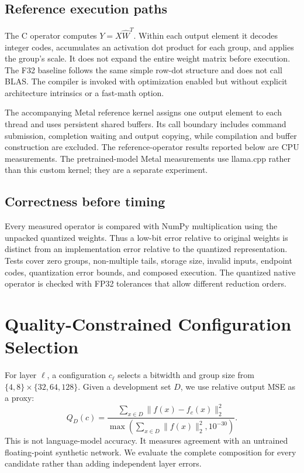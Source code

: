 \documentclass[11pt]{article}
\begin{document}
\subsection{Reference execution paths}
The C operator computes $Y=X\widehat W^T$. Within each output element it decodes
integer codes, accumulates an activation dot product for each group, and applies
the group's scale. It does not expand the entire weight matrix before execution.
The F32 baseline follows the same simple row-dot structure and does not call BLAS.
The compiler is invoked with optimization enabled but without explicit
architecture intrinsics or a fast-math option.

The accompanying Metal reference kernel assigns one output element to each thread
and uses persistent shared buffers. Its call boundary includes command submission,
completion waiting and output copying, while compilation and buffer construction
are excluded. The reference-operator results reported below are CPU measurements.
The pretrained-model Metal measurements use llama.cpp rather than this custom
kernel; they are a separate experiment.

\subsection{Correctness before timing}
Every measured operator is compared with NumPy multiplication using the unpacked
quantized weights. Thus a low-bit error relative to original weights is distinct
from an implementation error relative to the quantized representation. Tests cover
zero groups, non-multiple tails, storage size, invalid inputs, endpoint codes,
quantization error bounds, and composed execution. The quantized native operator is
checked with FP32 tolerances that allow different reduction orders.

\section{Quality-Constrained Configuration Selection}
For layer $\ell$, a configuration $c_\ell$ selects a bitwidth and group size from
$\{4,8\}\times\{32,64,128\}$. Given a development set $D$, we use relative output
MSE as a proxy:
\begin{equation}
Q_D(c)=\frac{\sum_{x\in D}\|f(x)-f_c(x)\|_2^2}
{\max(\sum_{x\in D}\|f(x)\|_2^2,10^{-30})}.
\end{equation}
This is not language-model accuracy. It measures agreement with an untrained
floating-point synthetic network. We evaluate the complete composition for every
candidate rather than adding independent layer errors.
\end{document}
